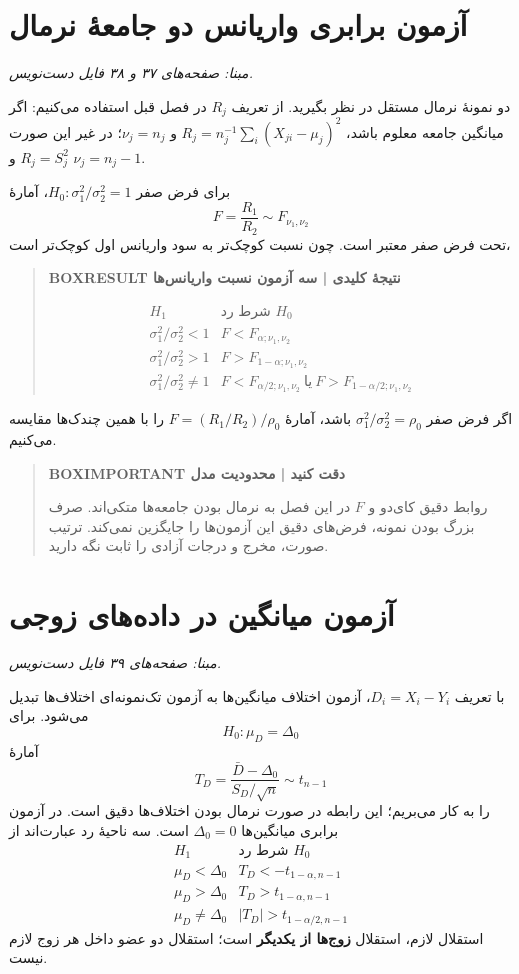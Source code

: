 \section{آزمون برابری واریانس دو جامعهٔ نرمال}
\textit{مبنا: صفحه‌های ۳۷ و ۳۸ فایل دست‌نویس.}\par 
دو نمونهٔ نرمال مستقل در نظر بگیرید. از تعریف $R_j$ در فصل قبل استفاده می‌کنیم: اگر میانگین جامعه معلوم باشد، $R_j=n_j^{-1}\sum_i(X_{ji}-\mu_j)^2$ و $\nu_j=n_j$؛ در غیر این صورت $R_j=S_j^2$ و $\nu_j=n_j-1$.

برای فرض صفر $H_0:\sigma_1^2/\sigma_2^2=1$، آمارهٔ
\[F=\frac{R_1}{R_2}\sim F_{\nu_1,\nu_2}\]
تحت فرض صفر معتبر است. چون نسبت کوچک‌تر به سود واریانس اول کوچک‌تر است،
\begin{quote}\textbf{BOXRESULT نتیجهٔ کلیدی | سه آزمون نسبت واریانس‌ها}\par 
\[
\begin{array}{c|c}
H_1&\text{شرط رد }H_0\\\hline
\sigma_1^2/\sigma_2^2<1&F<F_{\alpha;\nu_1,\nu_2}\\[2pt]
\sigma_1^2/\sigma_2^2>1&F>F_{1-\alpha;\nu_1,\nu_2}\\[2pt]
\sigma_1^2/\sigma_2^2\ne1&F<F_{\alpha/2;\nu_1,\nu_2}\ \text{یا}\ F>F_{1-\alpha/2;\nu_1,\nu_2}
\end{array}
\]
\end{quote}
اگر فرض صفر $\sigma_1^2/\sigma_2^2=\rho_0$ باشد، آمارهٔ $F=(R_1/R_2)/\rho_0$ را با همین چندک‌ها مقایسه می‌کنیم.
\begin{quote}\textbf{BOXIMPORTANT دقت کنید | محدودیت مدل}\par 
روابط دقیق کای‌دو و $F$ در این فصل به نرمال بودن جامعه‌ها متکی‌اند. صرف بزرگ بودن نمونه، فرض‌های دقیق این آزمون‌ها را جایگزین نمی‌کند. ترتیب صورت، مخرج و درجات آزادی را ثابت نگه دارید.
\end{quote}
\section{آزمون میانگین در داده‌های زوجی}
\textit{مبنا: صفحه‌های ۳۹ فایل دست‌نویس.}\par 
با تعریف $D_i=X_i-Y_i$، آزمون اختلاف میانگین‌ها به آزمون تک‌نمونه‌ای اختلاف‌ها تبدیل می‌شود. برای
\[H_0:\mu_D=\Delta_0\]
آمارهٔ
\[T_D=\frac{\bar D-\Delta_0}{S_D/\sqrt n}\sim t_{n-1}\]
را به کار می‌بریم؛ این رابطه در صورت نرمال بودن اختلاف‌ها دقیق است. در آزمون برابری میانگین‌ها $\Delta_0=0$ است. سه ناحیهٔ رد عبارت‌اند از
\[
\begin{array}{c|c}
H_1&\text{شرط رد }H_0\\\hline
\mu_D<\Delta_0&T_D<-t_{1-\alpha,n-1}\\[2pt]
\mu_D>\Delta_0&T_D>t_{1-\alpha,n-1}\\[2pt]
\mu_D\ne\Delta_0&|T_D|>t_{1-\alpha/2,n-1}
\end{array}
\]
استقلال لازم، استقلال \textbf{زوج‌ها از یکدیگر} است؛ استقلال دو عضو داخل هر زوج لازم نیست.

